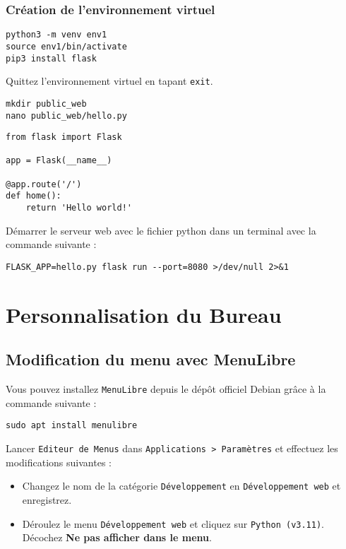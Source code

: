 \subsection{Création de l'environnement virtuel}

\begin{lstlisting}
python3 -m venv env1
source env1/bin/activate
pip3 install flask
\end{lstlisting}

Quittez l'environnement virtuel en tapant \texttt{exit}.

\begin{lstlisting}
mkdir public_web
nano public_web/hello.py
\end{lstlisting}

\begin{lstlisting}[style=tf]
from flask import Flask

app = Flask(__name__)

@app.route('/')
def home():
	return 'Hello world!'
\end{lstlisting}

Démarrer le serveur web avec le fichier python dans un terminal avec la commande suivante :
\begin{lstlisting}
FLASK_APP=hello.py flask run --port=8080 >/dev/null 2>&1
\end{lstlisting}

\chapter{Personnalisation du Bureau}

\section{Modification du menu avec MenuLibre}

Vous pouvez installez \texttt{MenuLibre} depuis le dépôt officiel Debian grâce à la commande suivante :

\begin{lstlisting}
sudo apt install menulibre
\end{lstlisting}

Lancer \texttt{Editeur de Menus} dans \texttt{Applications > Paramètres} et effectuez les modifications suivantes :
\begin{itemize}
	\item Changez le nom de la catégorie \texttt{Développement} en \texttt{Développement web} et enregistrez.
	\item Déroulez le menu \texttt{Développement web} et cliquez sur \texttt{Python (v3.11)}. Décochez \textbf{Ne pas afficher dans le menu}.
\end{itemize}

